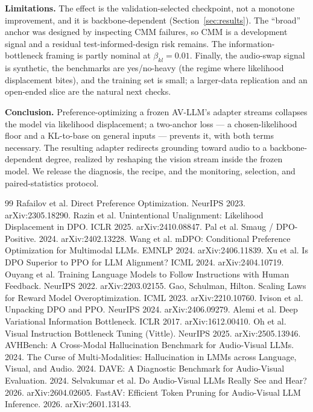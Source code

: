 \documentclass{article}
\begin{document}
\textbf{Limitations.} The effect is the validation-selected checkpoint, not a monotone improvement, and it
is backbone-dependent (Section~\ref{sec:results}). The ``broad'' anchor was designed by inspecting CMM
failures, so CMM is a development signal and a residual test-informed-design risk remains. The
information-bottleneck framing is partly nominal at $\beta_{kl}{=}0.01$. Finally, the audio-swap signal is
synthetic, the benchmarks are yes/no-heavy (the regime where likelihood displacement bites), and the
training set is small; a larger-data replication and an open-ended slice are the natural next checks.

\textbf{Conclusion.} Preference-optimizing a frozen AV-LLM's adapter streams collapses the model via
likelihood displacement; a two-anchor loss --- a chosen-likelihood floor and a KL-to-base on general
inputs --- prevents it, with both terms necessary. The resulting adapter redirects grounding toward audio
to a backbone-dependent degree, realized by reshaping the vision stream inside the frozen model. We release
the diagnosis, the recipe, and the monitoring, selection, and paired-statistics protocol.

{\small
\begin{thebibliography}{99}
 Rafailov et al. Direct Preference Optimization. NeurIPS 2023. arXiv:2305.18290.
 Razin et al. Unintentional Unalignment: Likelihood Displacement in DPO. ICLR 2025. arXiv:2410.08847.
 Pal et al. Smaug / DPO-Positive. 2024. arXiv:2402.13228.
 Wang et al. mDPO: Conditional Preference Optimization for Multimodal LLMs. EMNLP 2024. arXiv:2406.11839.
 Xu et al. Is DPO Superior to PPO for LLM Alignment? ICML 2024. arXiv:2404.10719.
 Ouyang et al. Training Language Models to Follow Instructions with Human Feedback. NeurIPS 2022. arXiv:2203.02155.
 Gao, Schulman, Hilton. Scaling Laws for Reward Model Overoptimization. ICML 2023. arXiv:2210.10760.
 Ivison et al. Unpacking DPO and PPO. NeurIPS 2024. arXiv:2406.09279.
 Alemi et al. Deep Variational Information Bottleneck. ICLR 2017. arXiv:1612.00410.
 Oh et al. Visual Instruction Bottleneck Tuning (Vittle). NeurIPS 2025. arXiv:2505.13946.
 AVHBench: A Cross-Modal Hallucination Benchmark for Audio-Visual LLMs. 2024.
 The Curse of Multi-Modalities: Hallucination in LMMs across Language, Visual, and Audio. 2024.
 DAVE: A Diagnostic Benchmark for Audio-Visual Evaluation. 2024.
 Selvakumar et al. Do Audio-Visual LLMs Really See and Hear? 2026. arXiv:2604.02605.
 FastAV: Efficient Token Pruning for Audio-Visual LLM Inference. 2026. arXiv:2601.13143.
\end{thebibliography}
}
\end{document}
